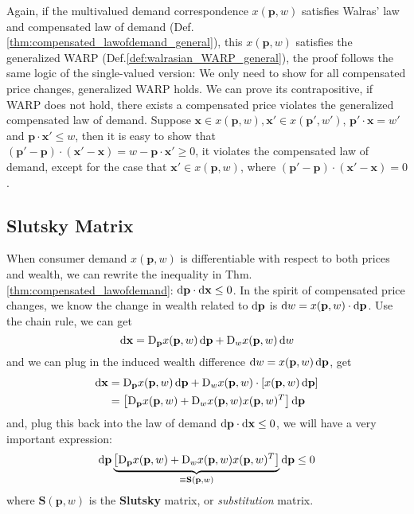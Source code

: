 Again, if the multivalued demand correspondence $ x(\mathbf{p},w)$ satisfies Walras' law and compensated law of demand (Def.\ref{thm:compensated_lawofdemand_general}), this $ x(\mathbf{p},w)$ satisfies the generalized WARP (Def.\ref{def:walrasian_WARP_general}), the proof follows the same logic of the single-valued version:
We only need to show for all compensated price changes, generalized WARP holds. We can prove its contrapositive, if WARP does not hold, there exists a compensated price violates the generalized compensated law of demand. Suppose $\mathbf{x}\in  x(\mathbf{p},w),\mathbf{x}'\in  x(\mathbf{p}',w')$, $\mathbf{p}'\cdot\mathbf{x}=w'$ and $\mathbf{p}\cdot\mathbf{x}'\leq w$, then it is easy to show that $(\mathbf{p}'-\mathbf{p})\cdot (\mathbf{x}'-\mathbf{x})=w-\mathbf{p}\cdot \mathbf{x}'\geq 0$, it violates the compensated law of demand, except for the case that $\mathbf{x}'\in  x(\mathbf{p},w)$, where $(\mathbf{p}'-\mathbf{p})\cdot (\mathbf{x}'-\mathbf{x})=0$.

\subsection{Slutsky Matrix}
When consumer demand $ x(\mathbf{p},w)$ is differentiable with respect to both prices and wealth, we can rewrite the inequality in Thm.\ref{thm:compensated_lawofdemand}: $\mathop{}\!\mathrm{d} \mathbf{p}\cdot \mathop{}\!\mathrm{d} \mathbf{x}\leq 0$. In the spirit of compensated price changes, we know the change in wealth related to $\mathop{}\!\mathrm{d} \mathbf{p}$ is $\mathop{}\!\mathrm{d} w= x(\mathbf{p},w)\cdot \mathop{}\!\mathrm{d} \mathbf{p}$.
Use the chain rule, we can get
$$\mathop{}\!\mathrm{d} \mathbf{x}= \mathop{}\!\mathrm{D}_{\mathbf{p}} x(\mathbf{p},w)\mathop{}\!\mathrm{d} \mathbf{p} + \mathop{}\!\mathrm{D}_w  x(\mathbf{p},w)\mathop{}\!\mathrm{d} w$$
and we can plug in the induced wealth difference $\mathop{}\!\mathrm{d} w= x(\mathbf{p},w)\mathop{}\!\mathrm{d} \mathbf{p}$, get
\begin{align*}
    \diff \mathbf{x} & = \mdiff_{\mathbf{p}} x(\mathbf{p},w)\diff \mathbf{p} + \mdiff_w  x(\mathbf{p},w) \cdot \left[ x(\mathbf{p},w)\diff \mathbf{p}\right]\\
    & =\left[ \mdiff_{\mathbf{p}} x(\mathbf{p},w) + \mdiff_w  x(\mathbf{p},w) x(\mathbf{p},w)^T\right] \diff \mathbf{p}
\end{align*}
and, plug this back into the law of demand $ \mathop{}\!\mathrm{d} \mathbf{p}\cdot \mathop{}\!\mathrm{d} \mathbf{x}\leq 0$, we will have a very important expression:
$$
\mathop{}\!\mathrm{d} \mathbf{p} \underbrace{\left[ \mathop{}\!\mathrm{D}_{\mathbf{p}} x(\mathbf{p},w) + \mathop{}\!\mathrm{D}_w  x(\mathbf{p},w) x(\mathbf{p},w)^T\right]}_{\equiv \mathbf{S}(\mathbf{p},w)} \mathop{}\!\mathrm{d} \mathbf{p}\leq 0
$$
where $\mathbf{S}(\mathbf{p},w)$ is the \textbf{Slutsky} matrix, or \textit{substitution} matrix. 


